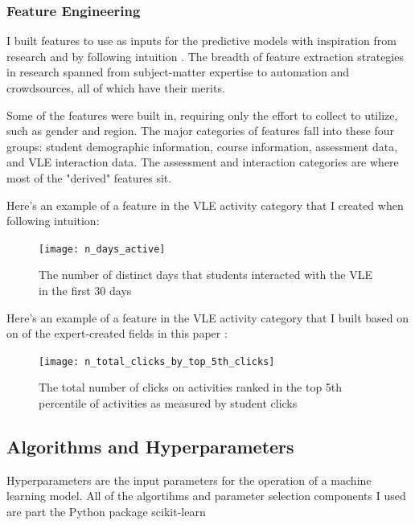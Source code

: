 \documentclass{article}
\begin{document}
            \subsubsection{Feature Engineering}
                I built features to use as inputs for the predictive models with inspiration from research and by following intuition \cite{automl2021, early2019}.
                The breadth of feature extraction strategies in research spanned from subject-matter expertise to automation and crowdsources, all of which have their merits.
                
                Some of the features were built in, requiring only the effort to collect to utilize, such as gender and region.
                The major categories of features fall into these four groups: student demographic information, course information, assessment data, and VLE interaction data. 
                The assessment and interaction categories are where most of the "derived" features sit.

                Here's an example of a feature in the VLE activity category that I created when following intuition:
                \begin{figure}
                    \centering
                    \texttt{[image: n\_days\_active]}
                    \caption{The number of distinct days that students interacted with the VLE in the first 30 days}
                    \label{fig:n_days_active}
                \end{figure}

                Here's an example of a feature in the VLE activity category that I built based on on of the expert-created fields in this paper \cite{automl2021}:
                \begin{figure}
                    \centering
                    \texttt{[image: n\_total\_clicks\_by\_top\_5th\_clicks]}
                    \caption{The total number of clicks on activities ranked in the top 5th percentile of activities as measured by student clicks}
                    \label{fig:n_total_clicks_by_top_5th_clicks}
                \end{figure}

        
        \subsection{Algorithms and Hyperparameters}
            Hyperparameters are the input parameters for the operation of a machine learning model.
            All of the algortihms and parameter selection components I used are part the Python package scikit-learn \cite{sklearn}
\end{document}
